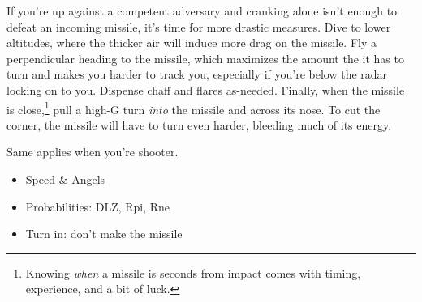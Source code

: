 If you're up against a competent adversary and cranking alone isn't enough to
defeat an incoming missile, it's time for more drastic measures.
Dive to lower altitudes, where the thicker air will induce more drag on
the missile. Fly a perpendicular heading to the missile,
which maximizes the amount the it has to turn and makes you harder 
to track you, especially if you're below the radar locking on to you.
Dispense chaff and flares as-needed.
Finally, when the missile is close,\punckern\footnote{Knowing \emph{when} a
missile is seconds from impact comes with timing, experience, and a bit of luck.}
pull a high-G turn \emph{into} the missile and across its nose.
To cut the corner, the missile will have to turn even harder,
bleeding much of its energy.

Same applies when you're shooter.
\begin{itemize}
\item Speed \& Angels
\item Probabilities: DLZ, Rpi, Rne
\item Turn in: don't make the missile
\end{itemize}
